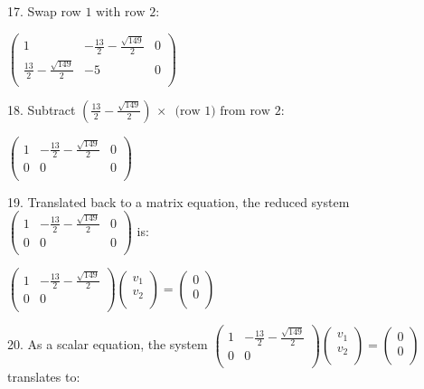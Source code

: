 \documentclass{article}
\begin{document}
17. Swap row $1\text{ with row }2:$

$\left(
\begin{array}{ccc}
1 & -\frac{13}{2}-\frac{\sqrt{149}}{2} & 0 \\
 \frac{13}{2}-\frac{\sqrt{149}}{2} & -5 & 0 \\
\end{array}
\right)$

18. Subtract $\left(\frac{13}{2}-\frac{\sqrt{149}}{2}\right)\, \times \,\text{ (row }1)\text{ from row }2:$

$\left(
\begin{array}{ccc}
1 & -\frac{13}{2}-\frac{\sqrt{149}}{2} & 0 \\
 0 & 0 & 0 \\
\end{array}
\right)$

19. Translated back to a matrix equation, the reduced system $\left(
\begin{array}{ccc}
1 & -\frac{13}{2}-\frac{\sqrt{149}}{2} & 0 \\
 0 & 0 & 0 \\
\end{array}
\right)$ is:

$\left(
\begin{array}{cc}
1 & -\frac{13}{2}-\frac{\sqrt{149}}{2} \\
 0 & 0 \\
\end{array}
\right)\left(
\begin{array}{c}
v_1 \\
 v_2 \\
\end{array}
\right)=\left(
\begin{array}{c}
0 \\
 0 \\
\end{array}
\right)$

20. As a scalar equation, the system $\left(
\begin{array}{cc}
1 & -\frac{13}{2}-\frac{\sqrt{149}}{2} \\
 0 & 0 \\
\end{array}
\right)\left(
\begin{array}{c}
v_1 \\
 v_2 \\
\end{array}
\right)=\left(
\begin{array}{c}
0 \\
 0 \\
\end{array}
\right)$ translates to:
\end{document}
